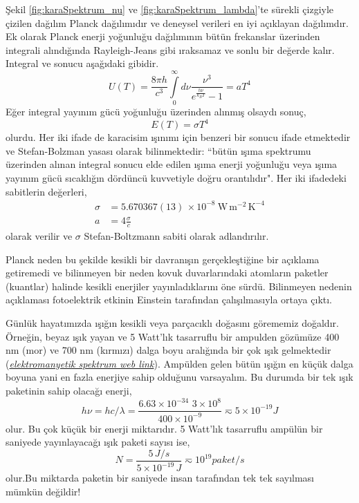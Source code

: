 \documentclass[a4paper,12pt, twoside]{article}
\begin{document}
Şekil \ref{fig:karaSpektrum_nu} ve \ref{fig:karaSpektrum_lambda}'te sürekli çizgiyle çizilen dağılım Planck dağılımıdır ve deneysel verileri en iyi açıklayan dağılımdır. Ek olarak Planck enerji yoğunluğu dağılımının bütün frekanslar üzerinden integrali alındığında Rayleigh-Jeans gibi ıraksamaz ve sonlu bir değerde kalır. Integral ve sonucu aşağıdaki gibidir.
\begin{equation}
\label{eq:Planck_U_total}
U(T) = \frac{8 \pi h}{c^{3}} \int\limits_0^\infty d\nu \frac{\nu^{3}}{e^{\frac{h \nu}{k_{B} T}} - 1} = a T^4
\end{equation}
Eğer integral yayınım gücü yoğunluğu üzerinden alınmış olsaydı sonuç,
\begin{equation}
\label{eq:Planck_E_total}
E(T) = \sigma T^4
\end{equation}
olurdu. Her iki ifade de karacisim ışınımı için benzeri bir sonucu ifade etmektedir ve Stefan-Bolzman yasası olarak bilinmektedir: ``bütün ışıma spektrumu üzerinden alınan integral sonucu elde edilen ışıma enerji yoğunluğu veya ışıma yayınım gücü sıcaklığın dördüncü kuvvetiyle doğru orantılıdır". Her iki ifadedeki sabitlerin değerleri,
\begin{align}
\label{eq:stefan_boltzman}
\sigma &=  5.670367(13) \, \times 10^{-8}\ \textrm{W}\,\textrm{m}^{-2}\,\textrm{K}^{-4} \\
a &= 4\frac{\sigma}{c} \nonumber
\end{align}
olarak verilir ve $\sigma$ Stefan-Boltzmann sabiti \cite{codata:stefan_boltzman} olarak adlandırılır.


Planck neden bu şekilde kesikli bir davranışın gerçekleştiğine bir açıklama getiremedi ve bilinmeyen bir neden kovuk duvarlarındaki atomların paketler (kuantlar) halinde kesikli enerjiler yayınladıklarını öne sürdü. Bilinmeyen nedenin açıklaması fotoelektrik etkinin Einstein tarafından çalışılmasıyla ortaya çıktı.

Günlük hayatımızda ışığın kesikli veya parçacıklı doğasını görememiz doğaldır. Örneğin, beyaz ışık yayan ve 5 Watt'lık tasarruflu bir ampulden gözümüze 400 nm (mor) ve 700 nm (kırmızı) dalga boyu aralığında bir çok ışık gelmektedir ({\it \href {https://upload.wikimedia.org/wikipedia/commons/2/25/Electromagnetic-Spectrum.svg}{elektromanyetik spektrum web link}}). Ampülden gelen bütün ışığın en küçük dalga boyuna yani en fazla enerjiye sahip olduğunu varsayalım. Bu durumda bir tek ışık paketinin sahip olacağı enerji,
\begin{equation}
\label{eq:example_light_quanta01}
h\nu = h c/\lambda = \frac{6.63\times10^{-34}\,\,3\times10^{8}}{400\times10^{-9}} \eqsim 5\times 10^{-19} J 
\end{equation}
olur. Bu çok küçük bir enerji miktarıdır. 5 Watt'lık tasarruflu ampülün bir saniyede yayınlayacağı ışık paketi sayısı ise,
\begin{equation}
\label{eq:example_light_quanta02}
N = \frac{5\,J/s}{5\times10^{-19}\,J} \eqsim 10^{19} paket/s
\end{equation}
olur.Bu miktarda paketin bir saniyede insan tarafından tek tek sayılması mümkün değildir!
\end{document}
